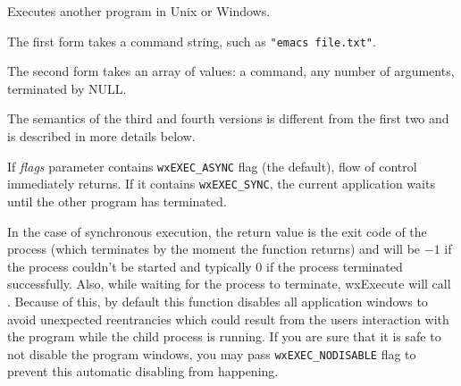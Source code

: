 






Executes another program in Unix or Windows.

The first form takes a command string, such as {\tt "emacs file.txt"}.

The second form takes an array of values: a command, any number of
arguments, terminated by NULL.

The semantics of the third and fourth versions is different from the first two
and is described in more details below.

If {\it flags} parameter contains {\tt wxEXEC\_ASYNC} flag (the default), flow
of control immediately returns. If it contains {\tt wxEXEC\_SYNC}, the current
application waits until the other program has terminated.

In the case of synchronous execution, the return value is the exit code of
the process (which terminates by the moment the function returns) and will be
$-1$ if the process couldn't be started and typically 0 if the process
terminated successfully. Also, while waiting for the process to
terminate, wxExecute will call . Because of this, by
default this function disables all application windows to avoid unexpected
reentrancies which could result from the users interaction with the program
while the child process is running. If you are sure that it is safe to not
disable the program windows, you may pass \texttt{wxEXEC\_NODISABLE} flag to
prevent this automatic disabling from happening.

